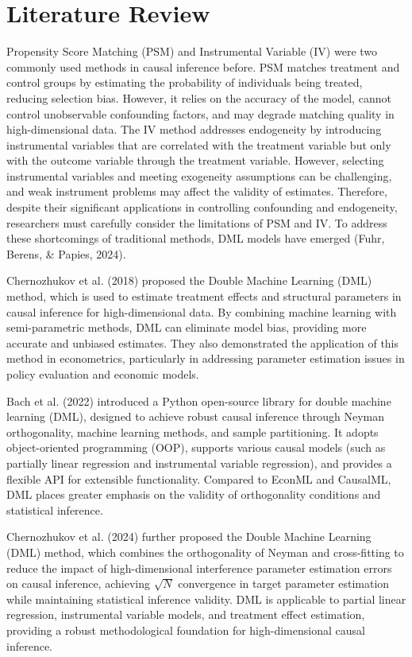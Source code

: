 \section{Literature Review}
Propensity Score Matching (PSM) and Instrumental Variable (IV) were two commonly used methods in causal inference before. PSM matches treatment and control groups by estimating the probability of individuals being treated, reducing selection bias. However, it relies on the accuracy of the model, cannot control unobservable confounding factors, and may degrade matching quality in high-dimensional data. The IV method addresses endogeneity by introducing instrumental variables that are correlated with the treatment variable but only with the outcome variable through the treatment variable. However, selecting instrumental variables and meeting exogeneity assumptions can be challenging, and weak instrument problems may affect the validity of estimates. Therefore, despite their significant applications in controlling confounding and endogeneity, researchers must carefully consider the limitations of PSM and IV. To address these shortcomings of traditional methods, DML models have emerged (Fuhr, Berens, \& Papies, 2024).

Chernozhukov et al. (2018) proposed the Double Machine Learning (DML) method, which is used to estimate treatment effects and structural parameters in causal inference for high-dimensional data. By combining machine learning with semi-parametric methods, DML can eliminate model bias, providing more accurate and unbiased estimates. They also demonstrated the application of this method in econometrics, particularly in addressing parameter estimation issues in policy evaluation and economic models.

Bach et al. (2022) introduced a Python open-source library for double machine learning (DML), designed to achieve robust causal inference through Neyman orthogonality, machine learning methods, and sample partitioning. It adopts object-oriented programming (OOP), supports various causal models (such as partially linear regression and instrumental variable regression), and provides a flexible API for extensible functionality. Compared to EconML and CausalML, DML places greater emphasis on the validity of orthogonality conditions and statistical inference.

Chernozhukov et al. (2024) further proposed the Double Machine Learning (DML) method, which combines the orthogonality of Neyman and cross-fitting to reduce the impact of high-dimensional interference parameter estimation errors on causal inference, achieving $\sqrt{N}$ convergence in target parameter estimation while maintaining statistical inference validity. DML is applicable to partial linear regression, instrumental variable models, and treatment effect estimation, providing a robust methodological foundation for high-dimensional causal inference.

